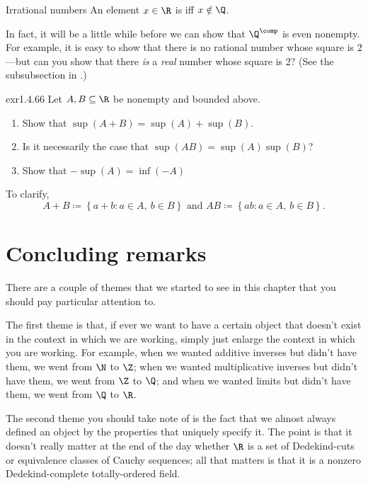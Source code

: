\begin{dfn}{Irrational numbers}{}
An element $x\in \R$ is  iff $x\notin \Q$.
\begin{rmk}
In fact, it will be a little while before we can show that $\Q ^{\comp}$ is even nonempty.  For example, it is easy to show that there is no rational number whose square is $2$---but can you show that there \emph{is} a \emph{real} number whose square is $2$?  (See the subsubsection  in .)
\end{rmk}
\end{dfn}

\begin{exr}{}{exr1.4.66}
Let $A,B\subseteq \R$ be nonempty and bounded above.
\begin{enumerate}
\item Show that $\sup (A+B)=\sup (A)+\sup (B)$.
\item Is it necessarily the case that $\sup (AB)=\sup (A)\sup (B)$?
\item Show that $-\sup (A)=\inf (-A)$
\end{enumerate}
\begin{rmk}
To clarify,
\begin{equation*}
A+B\coloneqq \left\{ a+b:a\in A,\ b\in B\right\} \text{ and }AB\coloneqq \left\{ ab:a\in A,\ b\in B\right\} .
\end{equation*}
\end{rmk}
\end{exr}

\section{Concluding remarks}

There are a couple of themes that we started to see in this chapter that you should pay particular attention to.

The first theme is that, if ever we want to have a certain object that doesn't exist in the context in which we are working, simply just enlarge the context in which you are working.  For example, when we wanted additive inverses but didn't have them, we went from $\N$ to $\Z$; when we wanted multiplicative inverses but didn't have them, we went from $\Z$ to $\Q$; and when we wanted limits but didn't have them, we went from $\Q$ to $\R$.

The second theme you should take note of is the fact that we almost always defined an object by the properties that uniquely specify it.  The point is that it doesn't really matter at the end of the day whether $\R$ is a set of Dedekind-cuts or equivalence classes of Cauchy sequences; all that matters is that it is a nonzero Dedekind-complete totally-ordered field.

